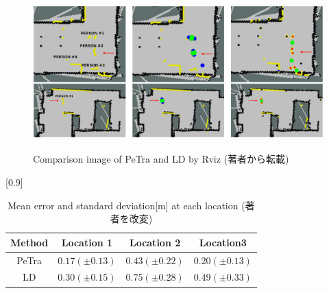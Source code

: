 \begin{figure}[h]
  \begin{center}
  \includegraphics[height=60mm,clip]{figure/2-4_result.png}
  \caption{Comparison image of PeTra and LD by Rviz
  (著者\cite{Tracking People in a Mobile Robot From 2D LIDAR Scans Using Full Convolutional Neural Networks for Security in Cluttered Environments}から転載)}
  \label{2-4_result}
  \end{center}
\end{figure}

\begin{table}[h]
  \begin{center}
    \caption{{Mean error and standard deviation[m] at each location
    (著者\cite{Tracking People in a Mobile Robot From 2D LIDAR Scans Using Full Convolutional Neural Networks for Security in Cluttered Environments}を改変)}
    \label{2-4_result_table}}
    \scalebox{1.0}[0.9]{
      \begin{tabular}{c|c|c|c} \hline
        Method & Location 1 & Location 2 & Location3 \\ \hline
        PeTra & $0.17 (\pm0.13)$ & $0.43 (\pm0.22)$ & $0.20 (\pm0.13)$ \\
        LD & $0.30 (\pm0.15)$ & $0.75 (\pm0.28)$ & $0.49 (\pm0.33)$ \\ \hline
      \end{tabular}
    }
  \end{center}
\end{table}

\clearpage

